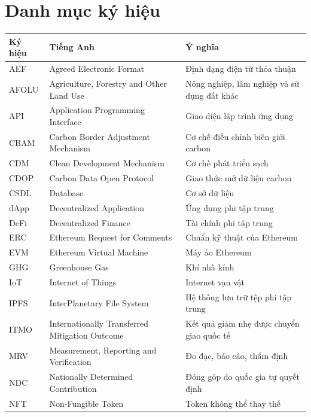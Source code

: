 \documentclass[a4paper,oneside]{report}
\numberwithin{equation}{chapter}
\begin{document}
\chapter*{Danh mục ký hiệu}
{}
\begin{longtable}{@{}p{2.4cm}p{5.4cm}p{6.3cm}@{}}
\toprule
\textbf{Ký hiệu} & \textbf{Tiếng Anh} & \textbf{Ý nghĩa} \\
\midrule
\endhead
\bottomrule
\endfoot
AEF    & Agreed Electronic Format                  & Định dạng điện tử thỏa thuận \\
AFOLU  & Agriculture, Forestry and Other Land Use  & Nông nghiệp, lâm nghiệp và sử dụng đất khác \\
API    & Application Programming Interface         & Giao diện lập trình ứng dụng \\
CBAM   & Carbon Border Adjustment Mechanism        & Cơ chế điều chỉnh biên giới carbon \\
CDM    & Clean Development Mechanism               & Cơ chế phát triển sạch \\
CDOP   & Carbon Data Open Protocol                 & Giao thức mở dữ liệu carbon \\
CSDL   & Database                                  & Cơ sở dữ liệu \\
dApp   & Decentralized Application                 & Ứng dụng phi tập trung \\
DeFi   & Decentralized Finance                     & Tài chính phi tập trung \\
ERC    & Ethereum Request for Comments             & Chuẩn kỹ thuật của Ethereum \\
EVM    & Ethereum Virtual Machine                  & Máy ảo Ethereum \\
GHG    & Greenhouse Gas                            & Khí nhà kính \\
IoT    & Internet of Things                        & Internet vạn vật \\
IPFS   & InterPlanetary File System                & Hệ thống lưu trữ tệp phi tập trung \\
ITMO   & Internationally Transferred Mitigation Outcome & Kết quả giảm nhẹ được chuyển giao quốc tế \\
MRV    & Measurement, Reporting and Verification   & Đo đạc, báo cáo, thẩm định \\
NDC    & Nationally Determined Contribution        & Đóng góp do quốc gia tự quyết định \\
NFT    & Non-Fungible Token                        & Token không thể thay thế \\

\end{longtable}
\end{document}
